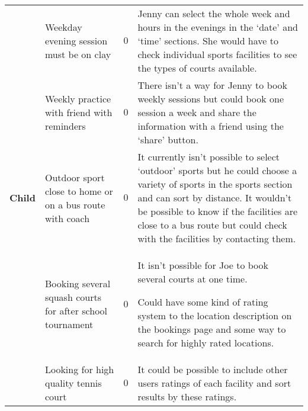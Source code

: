 \begin{center}
\begin{longtable}{p{} p{} c p{}}
		& Weekday evening session must be on clay & $0$ & Jenny can select the
		whole week and hours in the evenings in the `date' and `time' sections.
		She would have to check individual sports facilities to see the types
		of courts available.\\

		& Weekly practice with friend with reminders & $0$ & There isn't a way
		for Jenny to book weekly sessions but could book one session a week and
		share the information with a friend using the `share' button.\\

		\midrule \textbf{Child} & Outdoor sport close to home or on a bus route
		with coach & $0$ & It currently isn't possible to select `outdoor'
		sports but he could choose a variety of sports in the sports section
		and can sort by distance. It wouldn't be possible to know if the
		facilities are close to a bus route but could check with the facilities
		by contacting them.\\

		& Booking several squash courts for after school tournament & $0$ & It
		isn't possible for Joe to book several courts at one time.

		Could have some kind of rating system to the location description on
		the bookings page and some way to search for highly rated locations.\\

		& Looking for high quality tennis court & $0$ & It could be possible to
		include other users ratings of each facility and sort results by these
		ratings.\\
		\bottomrule
	\end{longtable}
\end{center}
